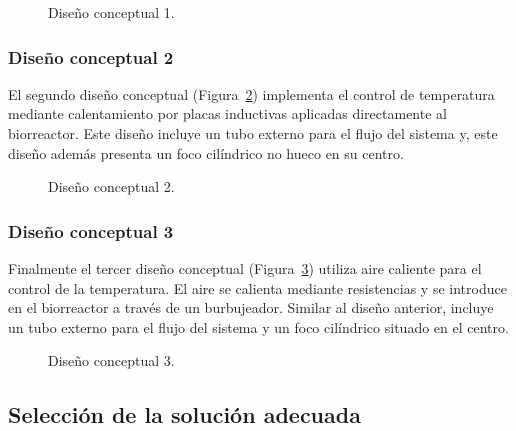 \documentclass[11pt,tesis,twoside,openright,spanish]{upiiztt}
\begin{document}
\begin{figure}[H]
  \centering
  \caption{Diseño conceptual 1.}
  \label{fig:dc1}
\end{figure}

\subsubsection{Diseño conceptual 2}

El segundo diseño conceptual (Figura~\ref{fig:dc2}) implementa el control de temperatura
mediante calentamiento por placas inductivas aplicadas directamente al
biorreactor. Este diseño incluye un tubo externo para el flujo del sistema y, este
diseño además presenta un foco cilíndrico no hueco en su centro.

\begin{figure}[H]
  \centering
  \caption{Diseño conceptual 2.}
  \label{fig:dc2}
\end{figure}

\subsubsection{Diseño conceptual 3}

Finalmente el tercer diseño conceptual (Figura~\ref{fig:dc3}) utiliza aire caliente para el control
de la temperatura. El aire se calienta mediante resistencias y se introduce en el
biorreactor a través de un burbujeador. Similar al diseño anterior, incluye un tubo
externo para el flujo del sistema y un foco cilíndrico situado en el centro.

\begin{figure}[H]
  \centering
  \caption{Diseño conceptual 3.}
  \label{fig:dc3}
\end{figure}

\subsection{Selección de la solución adecuada}
\end{document}
